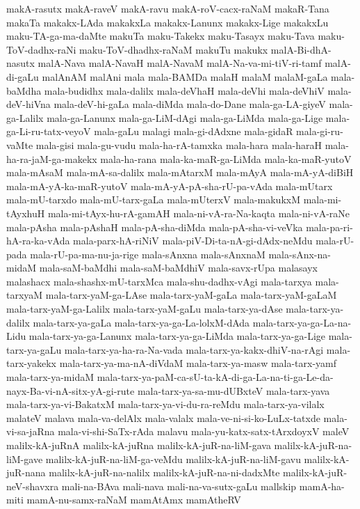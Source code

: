{makA-rasutx
makA-raveV
makA-ravu
makA-roV-cacx-raNaM
makaR-Tana
makaTa
makakx-LAda
makakxLa
makakx-Lanunx
makakx-Lige
makakxLu
maku-TA-ga-ma-daMte
makuTa
maku-Takekx
maku-Tasayx
maku-Tava
maku-ToV-dadhx-raNi
maku-ToV-dhadhx-raNaM
makuTu
makukx
malA-Bi-dhA-nasutx
malA-Nava
malA-NavaH
malA-NavaM
malA-Na-va-mi-tiV-ri-tamf
malA-di-gaLu
malAnAM
malAni
mala
mala-BAMDa
malaH
malaM
malaM-gaLa
mala-baMdha
mala-budidhx
mala-dalilx
mala-deVhaH
mala-deVhi
mala-deVhiV
mala-deV-hiVna
mala-deV-hi-gaLa
mala-diMda
mala-do-Dane
mala-ga-LA-giyeV
mala-ga-Lalilx
mala-ga-Lanunx
mala-ga-LiM-dAgi
mala-ga-LiMda
mala-ga-Lige
mala-ga-Li-ru-tatx-veyoV
mala-gaLu
malagi
mala-gi-dAdxne
mala-gidaR
mala-gi-ru-vaMte
mala-gisi
mala-gu-vudu
mala-ha-rA-tamxka
mala-hara
mala-haraH
mala-ha-ra-jaM-ga-makekx
mala-ha-rana
mala-ka-maR-ga-LiMda
mala-ka-maR-yutoV
mala-mAsaM
mala-mA-sa-dalilx
mala-mAtarxM
mala-mAyA
mala-mA-yA-diBiH
mala-mA-yA-ka-maR-yutoV
mala-mA-yA-pA-sha-rU-pa-vAda
mala-mUtarx
mala-mU-tarxdo
mala-mU-tarx-gaLa
mala-mUterxV
mala-makukxM
mala-mi-tAyxhuH
mala-mi-tAyx-hu-rA-gamAH
mala-ni-vA-ra-Na-kaqta
mala-ni-vA-raNe
mala-pAsha
mala-pAshaH
mala-pA-sha-diMda
mala-pA-sha-vi-veVka
mala-pa-ri-hA-ra-ka-vAda
mala-parx-hA-riNiV
mala-piV-Di-ta-nA-gi-dAdx-neMdu
mala-rU-pada
mala-rU-pa-ma-nu-ja-rige
mala-sAnxna
mala-sAnxnaM
mala-sAnx-na-midaM
mala-saM-baMdhi
mala-saM-baMdhiV
mala-savx-rUpa
malasayx
malashacx
mala-shashx-mU-tarxMca
mala-shu-dadhx-vAgi
mala-tarxya
mala-tarxyaM
mala-tarx-yaM-ga-LAse
mala-tarx-yaM-gaLa
mala-tarx-yaM-gaLaM
mala-tarx-yaM-ga-Lalilx
mala-tarx-yaM-gaLu
mala-tarx-ya-dAse
mala-tarx-ya-dalilx
mala-tarx-ya-gaLa
mala-tarx-ya-ga-La-lolxM-dAda
mala-tarx-ya-ga-La-na-Lidu
mala-tarx-ya-ga-Lanunx
mala-tarx-ya-ga-LiMda
mala-tarx-ya-ga-Lige
mala-tarx-ya-gaLu
mala-tarx-ya-ha-ra-Na-vada
mala-tarx-ya-kakx-dhiV-na-rAgi
mala-tarx-yakekx
mala-tarx-ya-ma-nA-diVdaM
mala-tarx-ya-masw
mala-tarx-yamf
mala-tarx-ya-midaM
mala-tarx-ya-paM-ca-sU-ta-kA-di-ga-La-na-ti-ga-Le-da-nayx-Ba-vi-nA-sitx-yA-gi-rute
mala-tarx-ya-sa-mu-dUBxteV
mala-tarx-yava
mala-tarx-ya-vi-BakatxM
mala-tarx-ya-vi-du-ra-reMdu
mala-tarx-ya-vilalx
malateV
malava
mala-va-delAlx
mala-valalx
mala-ve-ni-si-ko-LuLx-tatxde
mala-vi-sa-jaRna
mala-vi-shi-SaTx-rAda
malavu
mala-yu-katx-satx-tArxdoyxV
maleV
malilx-kA-juRnA
malilx-kA-juRna
malilx-kA-juR-na-liM-gava
malilx-kA-juR-na-liM-gave
malilx-kA-juR-na-liM-ga-veMdu
malilx-kA-juR-na-liM-gavu
malilx-kA-juR-nana
malilx-kA-juR-na-nalilx
malilx-kA-juR-na-ni-dadxMte
malilx-kA-juR-neV-shavxra
mali-na-BAva
mali-nava
mali-na-va-sutx-gaLu
mallskip
mamA-ha-miti
mamA-nu-samx-raNaM
mamAtAmx
mamAtheRV
}
